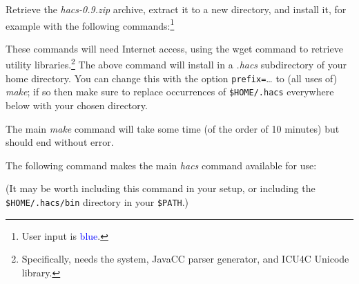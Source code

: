 \documentclass[11pt]{article} %
\begin{document}
\begin{commands}\label{com:all}
  Retrieve the \emph{hacs-0.9.zip} archive, extract it to a new directory, and install it, for
  example with the following commands:\footnote{User input is \textcolor{blue}{blue}.}
  These commands will need Internet access, using the wget command to retrieve utility
  libraries.\footnote{Specifically, \HAX needs the \CRSX system, JavaCC parser generator, and ICU4C
    Unicode library.} The above command will install \HAX in a \emph{.hacs} subdirectory of your
  home directory. You can change this with the option \verb|prefix=|…  to (all uses of) \emph{make};
  if so then make sure to replace occurrences of \verb|$HOME/.hacs| everywhere below with your
  chosen directory.

  The main \emph{make} command will take some time (of the order of 10 minutes) but should end
  without error.

  The following command makes the main \emph{hacs} command available for use:
  (It may be worth including this command in your setup, or including the \verb|$HOME/.hacs/bin|
  directory in your \verb|$PATH|.)


\end{commands}
\end{document}
